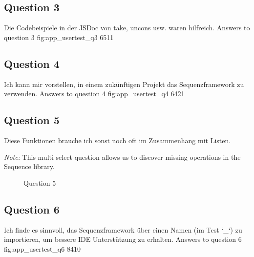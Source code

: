 \subsection*{Question 3}
\label{sub:ut_q3}
Die Codebeispiele in der JSDoc von take, uncons usw. waren hilfreich. 
\likertbarchart
  {Answers to question 3}
  {fig:app_usertest_q3}
  {6}{5}{1}{1}

\subsection*{Question 4}
\label{sub:ut_q4}
Ich kann mir vorstellen, in einem zukünftigen Projekt das Sequenzframework zu verwenden.
\likertbarchart
  {Answers to question 4}
  {fig:app_usertest_q4}
  {6}{4}{2}{1}

\subsection*{Question 5}
\label{sub:ut_q5}
Diese Funktionen brauche ich sonst noch oft im Zusammenhang mit Listen.

\textit{Note:} This multi select question allows us to discover missing
operations in the Sequence library.
  \begin{figure}[H]
    \centering
    \caption{Question 5}
    \label{fig:app_usertest_q5}
  \end{figure}
\subsection*{Question 6}
\label{sub:ut_q6}
Ich finde es sinnvoll, das Sequenzframework über einen Namen (im Test `\_`) zu importieren, um bessere IDE Unterstützung zu erhalten.
\likertbarchart
  {Answers to question 6}
  {fig:app_usertest_q6}
  {8}{4}{1}{0}

